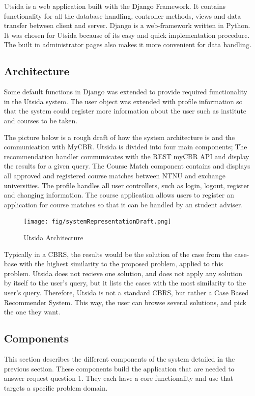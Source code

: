 Utsida is a web application built with the Django Framework. It contains functionality for all the database handling, controller methods, views and data transfer between client and server. Django is a web-framework written in Python. It was chosen for Utsida because of its easy and quick implementation procedure. The built in administrator pages also makes it more convenient for data handling.

\subsection{Architecture}

Some default functions in Django was extended to provide required functionality in the Utsida system. The user object was extended with profile information so that the system could register more information about the user such as institute and courses to be taken. 

The picture below is a rough draft of how the system architecture is and the communication with MyCBR. Utsida is divided into four main components; The recommendation handler communicates with the REST myCBR API and display the results for a given query. The Course Match component contains and displays all approved and registered course matches between NTNU and exchange universities. The profile handles all user controllers, such as login, logout, register and changing information. The course application allows users to register an application for course matches so that it can be handled by an student adviser. 

\begin{figure}[H]
    \centering
    \texttt{[image: fig/systemRepresentationDraft.png]}
    \caption{Utsida Architecture}
    \label{fig:utsida}
\end{figure}

Typically in a CBRS, the results would be the solution of the case from the case-base with the highest similarity to the proposed problem, applied to this problem. Utsida does not recieve one solution, and does not apply any solution by itself to the user's query, but it lists the cases with the most similarity to the user's query. Therefore, Utsida is not a standard CBRS, but rather a Case Based Recommender System. This way, the user can browse several solutions, and pick the one they want.


\subsection{Components}
This section describes the different components of the system detailed in the previous section. These components build the application that are needed to answer request question 1. They each have a core functionality and use that targets a specific problem domain. 


